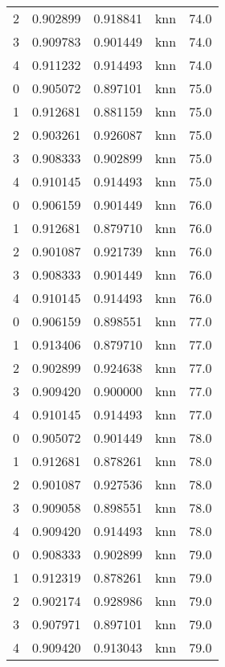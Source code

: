 \begin{tabular}{rrrlr}
     2 & 0.902899 & 0.918841 &      knn &       74.0 \\
     3 & 0.909783 & 0.901449 &      knn &       74.0 \\
     4 & 0.911232 & 0.914493 &      knn &       74.0 \\
     0 & 0.905072 & 0.897101 &      knn &       75.0 \\
     1 & 0.912681 & 0.881159 &      knn &       75.0 \\
     2 & 0.903261 & 0.926087 &      knn &       75.0 \\
     3 & 0.908333 & 0.902899 &      knn &       75.0 \\
     4 & 0.910145 & 0.914493 &      knn &       75.0 \\
     0 & 0.906159 & 0.901449 &      knn &       76.0 \\
     1 & 0.912681 & 0.879710 &      knn &       76.0 \\
     2 & 0.901087 & 0.921739 &      knn &       76.0 \\
     3 & 0.908333 & 0.901449 &      knn &       76.0 \\
     4 & 0.910145 & 0.914493 &      knn &       76.0 \\
     0 & 0.906159 & 0.898551 &      knn &       77.0 \\
     1 & 0.913406 & 0.879710 &      knn &       77.0 \\
     2 & 0.902899 & 0.924638 &      knn &       77.0 \\
     3 & 0.909420 & 0.900000 &      knn &       77.0 \\
     4 & 0.910145 & 0.914493 &      knn &       77.0 \\
     0 & 0.905072 & 0.901449 &      knn &       78.0 \\
     1 & 0.912681 & 0.878261 &      knn &       78.0 \\
     2 & 0.901087 & 0.927536 &      knn &       78.0 \\
     3 & 0.909058 & 0.898551 &      knn &       78.0 \\
     4 & 0.909420 & 0.914493 &      knn &       78.0 \\
     0 & 0.908333 & 0.902899 &      knn &       79.0 \\
     1 & 0.912319 & 0.878261 &      knn &       79.0 \\
     2 & 0.902174 & 0.928986 &      knn &       79.0 \\
     3 & 0.907971 & 0.897101 &      knn &       79.0 \\
     4 & 0.909420 & 0.913043 &      knn &       79.0 \\

\end{tabular}
